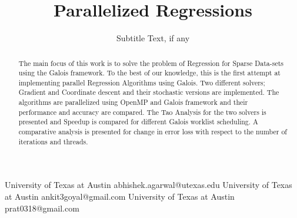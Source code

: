 \documentclass{sigplanconf}
\begin{document}
\setlength{\pdfpageheight}{\paperheight}
\setlength{\pdfpagewidth}{\paperwidth}






\title{Parallelized Regressions}
\subtitle{Subtitle Text, if any}

           {University of Texas at Austin}
           {abhishek.agarwal@utexas.edu}
           {University of Texas at Austin}
           {ankit3goyal@gmail.com}
           {University of Texas at Austin}
           {prat0318@gmail.com}

\maketitle

\begin{abstract}
The main focus of this work is to solve the problem of Regression for Sparse Data-sets using the Galois framework.
To the best of our knowledge, this is the first attempt at implementing parallel Regression Algorithms using
Galois. Two different solvers; Gradient and Coordinate descent and their stochastic versions are implemented. The
algorithms are parallelized using OpenMP and Galois framework and their performance and accuracy are compared.
The Tao Analysis for the two solvers is presented and Speedup is compared for different Galois worklist scheduling. A
comparative analysis is presented for change in error loss with respect to the number of iterations and threads. 
\end{abstract}
\end{document}
